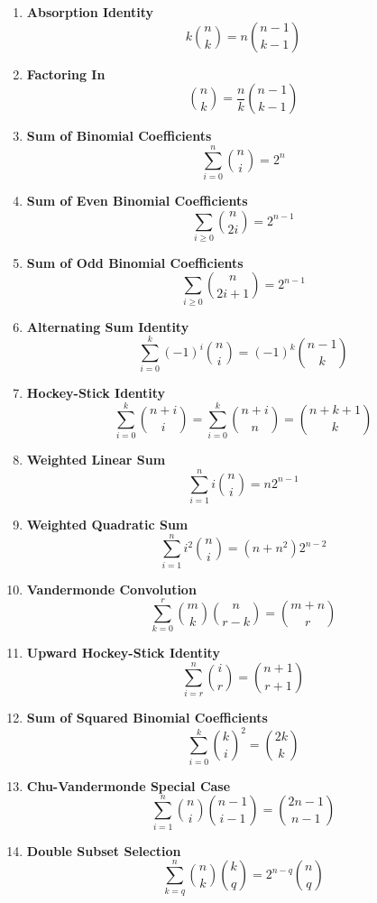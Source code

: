 \documentclass[twoside]{article}
\begin{document}
\begin{multicols*}{2}
\begin{enumerate}[leftmargin=*]
    \item \textbf{Absorption Identity}
        \[k\binom{n}{k} = n\binom{n-1}{k-1}\]
    
    \item \textbf{Factoring In}
        \[\binom{n}{k} = \frac{n}{k}\binom{n-1}{k-1}\]
    
    \item \textbf{Sum of Binomial Coefficients}
        \[\sum_{i=0}^n \binom{n}{i} = 2^n\]
    
    \item \textbf{Sum of Even Binomial Coefficients}
        \[\sum_{i\geq 0} \binom{n}{2i} = 2^{n-1}\]
    
    \item \textbf{Sum of Odd Binomial Coefficients}
        \[\sum_{i\geq 0} \binom{n}{2i+1} = 2^{n-1}\]
    
    \item \textbf{Alternating Sum Identity}
        \[\sum_{i=0}^k (-1)^i \binom{n}{i} = (-1)^k \binom{n-1}{k}\]
    
    \item \textbf{Hockey-Stick Identity}
        \[\sum_{i=0}^k \binom{n+i}{i} = \sum_{i=0}^k \binom{n+i}{n} = \binom{n+k+1}{k}\]
    
    \item \textbf{Weighted Linear Sum}
        \[\sum_{i=1}^n i\binom{n}{i} = n2^{n-1}\]
    
    \item \textbf{Weighted Quadratic Sum}
        \[\sum_{i=1}^n i^2\binom{n}{i} = (n+n^2)2^{n-2}\]
    
    \item \textbf{Vandermonde Convolution}
        \[\sum_{k=0}^r \binom{m}{k}\binom{n}{r-k} = \binom{m+n}{r}\]
    
    \item \textbf{Upward Hockey-Stick Identity}
        \[\sum_{i=r}^n \binom{i}{r} = \binom{n+1}{r+1}\]
    
    \item \textbf{Sum of Squared Binomial Coefficients}
        \[\sum_{i=0}^k \binom{k}{i}^2 = \binom{2k}{k}\]
    
    \item \textbf{Chu-Vandermonde Special Case}
        \[\sum_{i=1}^n \binom{n}{i}\binom{n-1}{i-1} = \binom{2n-1}{n-1}\]
    
    \item \textbf{Double Subset Selection}
        \[\sum_{k=q}^n \binom{n}{k}\binom{k}{q} = 2^{n-q}\binom{n}{q}\]
    

\end{enumerate}
\end{multicols*}
\end{document}
